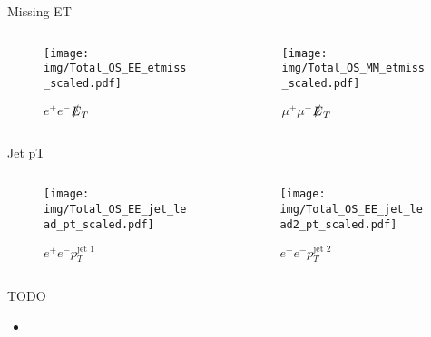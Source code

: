 \documentclass{beamer}
\begin{document}
\begin{frame}{Missing ET}
  \begin{columns}
    \begin{column}{0.45\textwidth}\begin{figure}
      \caption{$e^{+}e^{-}$$\slashed{E}_{T}$}
      \texttt{[image: img/Total\_OS\_EE\_etmiss\_scaled.pdf]}
    \end{figure}\end{column}
    \begin{column}{0.45\textwidth}\begin{figure}
      \caption{$\mu^{+}\mu^{-}$$\slashed{E}_{T}$}
      \texttt{[image: img/Total\_OS\_MM\_etmiss\_scaled.pdf]}
    \end{figure}\end{column}
  \end{columns}
\end{frame}

\begin{frame}{Jet pT}
  \begin{columns}
    \begin{column}{0.45\textwidth}\begin{figure}
      \caption{$e^{+}e^{-}$$p_{T}^{\text{jet 1}}$}
      \texttt{[image: img/Total\_OS\_EE\_jet\_lead\_pt\_scaled.pdf]}
    \end{figure}\end{column}
    \begin{column}{0.45\textwidth}\begin{figure}
      \caption{$e^{+}e^{-}$$p_{T}^{\text{jet 2}}$}
      \texttt{[image: img/Total\_OS\_EE\_jet\_lead2\_pt\_scaled.pdf]}
    \end{figure}\end{column}
  \end{columns}
\end{frame}

\begin{frame}{TODO}
  \begin{itemize}
    \item 
  \end{itemize}
\end{frame}
\end{document}
